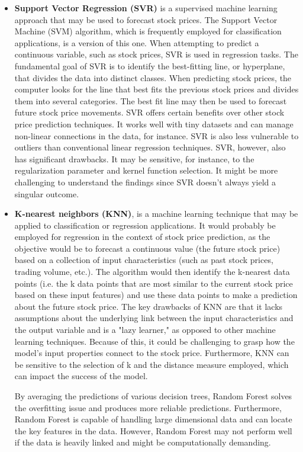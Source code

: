 \documentclass[a4paper]{article}
\begin{document}
\begin{itemize}[leftmargin=7.5pt]
    \item \textbf{Support Vector Regression (SVR)} is a supervised machine learning approach that may be used to forecast stock prices. The Support Vector Machine (SVM) algorithm, which is frequently employed for classification applications, is a version of this one. When attempting to predict a continuous variable, such as stock prices, SVR is used in regression tasks. The fundamental goal of SVR is to identify the best-fitting line, or hyperplane, that divides the data into distinct classes. When predicting stock prices, the computer looks for the line that best fits the previous stock prices and divides them into several categories. The best fit line may then be used to forecast future stock price movements. SVR offers certain benefits over other stock price prediction techniques. It works well with tiny datasets and can manage non-linear connections in the data, for instance. SVR is also less vulnerable to outliers than conventional linear regression techniques. SVR, however, also has significant drawbacks. It may be sensitive, for instance, to the regularization parameter and kernel function selection. It might be more challenging to understand the findings since SVR doesn't always yield a singular outcome.

    \item \textbf{K-nearest neighbors (KNN)}, is a machine learning technique that may be applied to classification or regression applications. It would probably be employed for regression in the context of stock price prediction, as the objective would be to forecast a continuous value (the future stock price) based on a collection of input characteristics (such as past stock prices, trading volume, etc.). The algorithm would then identify the k-nearest data points (i.e. the k data points that are most similar to the current stock price based on these input features) and use these data points to make a prediction about the future stock price. The key drawbacks of KNN are that it lacks assumptions about the underlying link between the input characteristics and the output variable and is a "lazy learner," as opposed to other machine learning techniques. Because of this, it could be challenging to grasp how the model's input properties connect to the stock price. Furthermore, KNN can be sensitive to the selection of k and the distance measure employed, which can impact the success of the model.

    By averaging the predictions of various decision trees, Random Forest solves the overfitting issue and produces more reliable predictions. Furthermore, Random Forest is capable of handling large dimensional data and can locate the key features in the data. However, Random Forest may not perform well if the data is heavily linked and might be computationally demanding.
    
\end{itemize}
\end{document}
